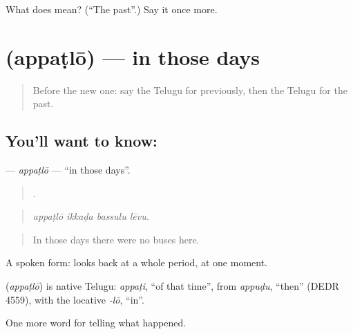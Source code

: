 \begin{tcolorbox}[breakable,colback=teal!4,colframe=teal!35!black,title={Before you move on}]
What does  mean? (\textquotedblleft{}The past\textquotedblright{}.) Say it once more.
\end{tcolorbox}
\section[\texorpdfstring{\te{అప్పట్లో} (appaṭlō)}{అప్పట్లో (appaṭlō)}]{ (appaṭlō) — in those days}

\label{lesson:TE-C338-appatlo}



\begin{quote}
Before the new one: say the Telugu for previously, then the Telugu for the past.
\end{quote}

\subsection*{You'll want to know: }
\textbf{} — \emph{appaṭlō} — \textquotedblleft{}in those days\textquotedblright{}.

\begin{quote}
   .
\end{quote}

\begin{quote}
\emph{appaṭlō ikkaḍa bassulu lēvu.}
\end{quote}

\begin{quote}
In those days there were no buses here.
\end{quote}

A spoken form:  looks back at a whole period,  at one moment.

\begin{cousinweb}
\textbf{} (\emph{appaṭlō}) is native Telugu: \emph{appaṭi}, \textquotedblleft{}of that time\textquotedblright{}, from \emph{appuḍu}, \textquotedblleft{}then\textquotedblright{} (DEDR 4559), with the locative \emph{-lō}, \textquotedblleft{}in\textquotedblright{}.
\end{cousinweb}

\begin{grammarlens}[title={What you've built}]
One more word for telling what happened.
\end{grammarlens}


